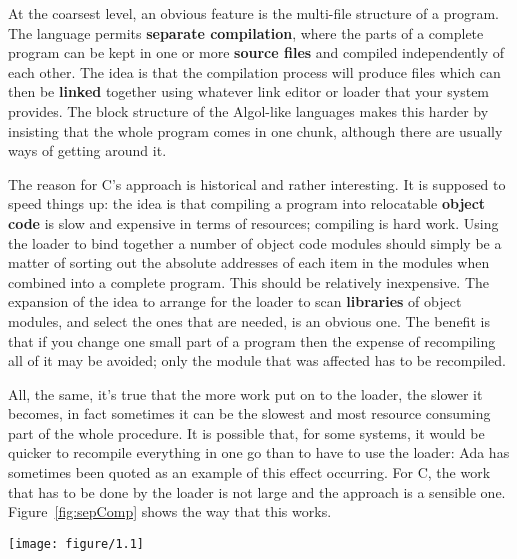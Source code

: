   At the coarsest level, an obvious feature is the multi-file structure of a
   program. The language permits \textbf{separate compilation}, where the
   parts of a complete program can be kept in one or more \textbf{source
   files} and compiled independently of each other. The idea is that the
   compilation process will produce files which can then be \textbf{linked}
   together using whatever link editor or loader that your system provides. The
   block structure of the Algol-like languages makes this harder by insisting
   that the whole program comes in one chunk, although there are usually ways
   of getting around it.


  The reason for C's approach is historical and rather interesting. It is
   supposed to speed things up: the idea is that compiling a program into
   relocatable \textbf{object code} is slow and expensive in terms of
   resources; compiling is hard work. Using the loader to bind together a
   number of object code modules should simply be a matter of sorting out the
   absolute addresses of each item in the modules when combined into a complete
   program. This should be relatively inexpensive. The expansion of the idea to
   arrange for the loader to scan \textbf{libraries} of object modules, and
   select the ones that are needed, is an obvious one. The benefit is that if
   you change one small part of a program then the expense of recompiling all
   of it may be avoided; only the module that was affected has to be
   recompiled.


  All, the same, it's true that the more work put on to the loader, the
   slower it becomes, in fact sometimes it can be the slowest and most resource
   consuming part of the whole procedure. It is possible that, for some
   systems, it would be quicker to recompile everything in one go than to have
   to use the loader: Ada has sometimes been quoted as an example of this
   effect occurring. For C, the work that has to be done by the loader is not
   large and the approach is a sensible one.
   Figure~\ref{fig:sepComp} shows the way that this works.


   \begin{figure*}[htb]
     \centering
     \texttt{[image: figure/1.1]}
     \caption*{Diagram showing multiple files going from source, through           compilation, to object files, and being combined with libraries by           the loader to produce a program.}
     \caption{\label{fig:sepComp}Separate compilation}
   \end{figure*}


